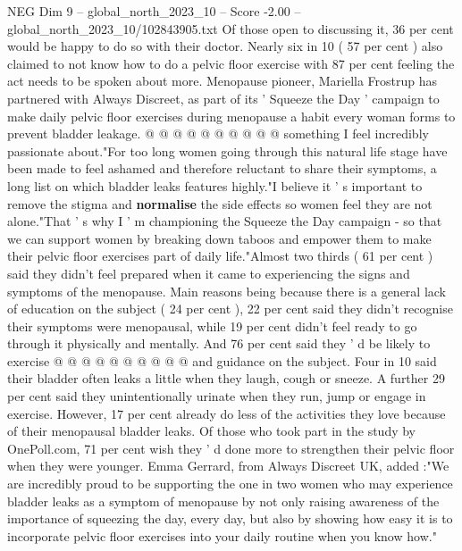 \begin{textsample}{NEG Dim 9 – global\_north\_2023\_10 – Score -2.00 – global\_north\_2023\_10/102843905.txt}
Of those open to discussing it, 36 per cent would be happy to do so with their doctor.
Nearly six in 10 ( 57 per cent ) also claimed to not know how to do a pelvic floor exercise with 87 per cent feeling the act needs to be spoken about more.
Menopause pioneer, Mariella Frostrup has partnered with Always Discreet, as part of its ' Squeeze the Day ' campaign to make daily pelvic floor exercises during menopause a habit every woman forms to prevent bladder leakage. @ @ @ @ @ @ @ @ @ @ something I feel incredibly passionate about."For too long women going through this natural life stage have been made to feel ashamed and therefore reluctant to share their symptoms, a long list on which bladder leaks features highly."I believe it ' s important to remove the stigma and \textbf{normalise} the side effects so women feel they are not alone."That ' s why I ' m championing the Squeeze the Day campaign - so that we can support women by breaking down taboos and empower them to make their pelvic floor exercises part of daily life."Almost two thirds ( 61 per cent ) said they didn't feel prepared when it came to experiencing the signs and symptoms of the menopause.
Main reasons being because there is a general lack of education on the subject ( 24 per cent ), 22 per cent said they didn't recognise their symptoms were menopausal, while 19 per cent didn't feel ready to go through it physically and mentally.
And 76 per cent said they ' d be likely to exercise @ @ @ @ @ @ @ @ @ @ and guidance on the subject.
Four in 10 said their bladder often leaks a little when they laugh, cough or sneeze.
A further 29 per cent said they unintentionally urinate when they run, jump or engage in exercise.
However, 17 per cent already do less of the activities they love because of their menopausal bladder leaks.
Of those who took part in the study by OnePoll.com, 71 per cent wish they ' d done more to strengthen their pelvic floor when they were younger.
Emma Gerrard, from Always Discreet UK, added :"We are incredibly proud to be supporting the one in two women who may experience bladder leaks as a symptom of menopause by not only raising awareness of the importance of squeezing the day, every day, but also by showing how easy it is to incorporate pelvic floor exercises into your daily routine when you know how."

\end{textsample}
